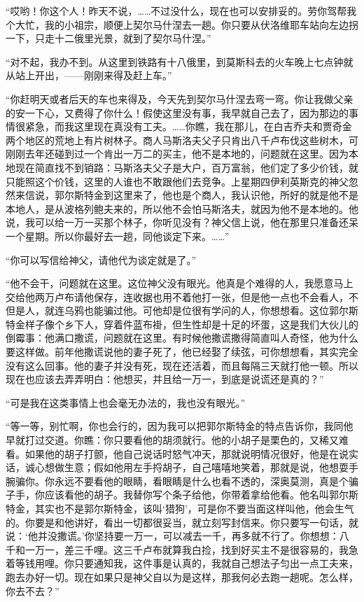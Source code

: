 \par “哎哟！你这个人！昨天不说，……不过没什么，现在也可以安排妥的。劳你驾帮我个大忙，我的小祖宗，顺便上契尔马什涅去一趟。你只要从伏洛维耶车站向左边拐一下，只走十二俄里光景，就到了契尔马什涅。”
\par “对不起，我办不到。从这里到铁路有十八俄里，到莫斯科去的火车晚上七点钟就从站上开出，——刚刚来得及赶上车。”
\par “你赶明天或者后天的车也来得及，今天先到契尔马什涅去弯一弯。你让我做父亲的安一下心，又费得了你什么！假使这里没有事，我早就自己去了，因为那边的事情很紧急，而我这里现在真没有工夫。……你瞧，我在那儿，在白吉乔夫和贾奇金两个地区的荒地上有片树林子。商人马斯洛夫父子只肯出八千卢布伐这些树木，可刚刚去年还碰到过一个肯出一万二的买主，他不是本地的，问题就在这里。因为本地现在简直找不到销路：马斯洛夫父子是大户，百万富翁，他们定了多少价钱，就只能照这个价钱，这里的人谁也不敢跟他们去竞争。上星期四伊利英斯克的神父忽然来信说，郭尔斯特金到这里来了，他也是个商人，我认识他，所好的就是他不是本地人，是从波格列鲍夫来的，所以他不会怕马斯洛夫，就因为他不是本地的。他说，我可以给一万一买那个林子，你听见没有？神父信上说，他在那里只准备还呆一个星期。所以你最好去一趟，同他谈定下来。……”
\par “你可以写信给神父，请他代为谈定就是了。”
\par “他不会干，问题就在这里。这位神父没有眼光。他真是个难得的人，我愿意马上交给他两万卢布请他保存，连收据也用不着他打一张，但是他一点也不会看人，不但是人，就连乌鸦也能骗过他。可他却是位很有学问的人，你想想看。这位郭尔斯特金样子像个乡下人，穿着件蓝布褂，但生性却是十足的坏蛋，这是我们大伙儿的倒霉事：他满口撒谎，问题就在这里。有时候他撒谎撒得简直叫人奇怪，他为什么要这样做。前年他撒谎说他的妻子死了，他已经娶了续弦，可你想想看，其实完全没有这么回事。他的妻子并没有死，现在还活着，而且每隔三天就打他一顿。所以现在也应该去弄弄明白：他想买，并且给一万一，到底是说谎还是真的？”
\par “可是我在这类事情上也会毫无办法的，我也没有眼光。”
\par “等一等，别忙啊，你也会行的，因为我可以把郭尔斯特金的特点告诉你，我同他早就打过交道。你瞧：你只要看他的胡须就行。他的小胡子是栗色的，又稀又难看。如果他的胡子打颤，他自己说话时怒气冲天，那就说明情况很好，他是在说实话，诚心想做生意；假如他用左手捋胡子，自己嘻嘻地笑着，那就是说，他想耍手腕骗你。你永远不要看他的眼睛，看眼睛是什么也看不透的，深奥莫测，真是个骗子手，你应该看他的胡子。我替你写个条子给他，你带着拿给他看。他名叫郭尔斯特金，其实也不是郭尔斯特金，该叫‘猎狗’，可是你不要当面这样叫他，他会生气的。你要是和他讲好，看出一切都很妥当，就立刻写封信来。你只要写一句话，就说：‘他并没撒谎。’你坚持要一万一，可以减去一千，再多就不行了。你想想：八千和一万一，差三千哩。这三千卢布就算我白捡，找到好买主不是很容易的，我急着等钱用哩。你只要通知我，这件事是认真的，我就自己想法子匀出一点工夫来，跑去办好一切。现在如果只是神父自以为是这样，那我何必去跑一趟呢。怎么样，你去不去？”
